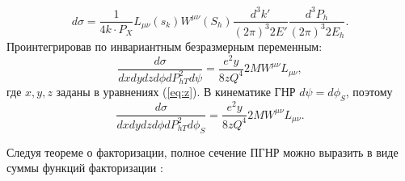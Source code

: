 \documentclass{extreport}
\begin{document}
\begin{equation}
	d\sigma = \frac{1}{4k\cdot P_X} L_{\mu\nu}(s_k) W^{\mu \nu}(S_h) \frac{d^3 k'}{(2\pi)^3 2E'}\frac{d^3 P_h}{(2\pi)^3 2E_h}.
\end{equation}
Проинтегрировав по инвариантным безразмерным переменным:
\begin{equation}
	\frac{d\sigma}{dxdydzd\phi dP^2_{hT}d\psi} = \frac{e^2 y}{8zQ^4}2MW^{\mu\nu}L_{\mu\nu},
\end{equation}
где $x,y,z$ заданы в уравнениях (\ref{eq:z}). В кинематике ГНР $d\psi = d\phi_S$, поэтому
\begin{equation}
		\frac{d\sigma}{dxdydzd\phi dP^2_{hT}d\phi_S} = \frac{e^2 y}{8zQ^4}2MW^{\mu\nu}L_{\mu\nu}.
\end{equation}

Следуя теореме о факторизации, полное сечение ПГНР можно выразить в виде суммы функций факторизации \cite{Anselmino_2011}:
\end{document}
